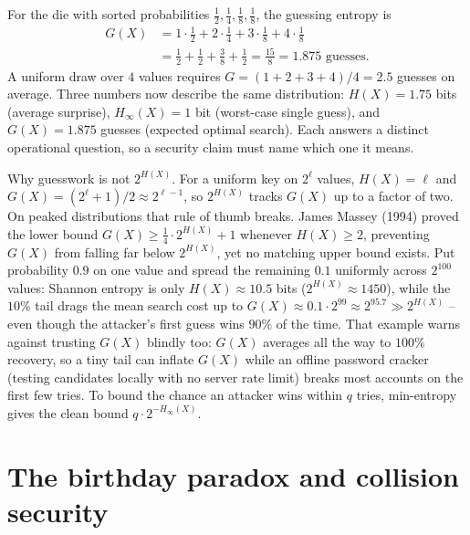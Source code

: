 \begin{example}
\label{ch07:guesswork}
For the die with sorted probabilities $\frac{1}{2}, \frac{1}{4}, \frac{1}{8}, \frac{1}{8}$, the guessing entropy is
\begin{align*}
  G(X) &= 1\cdot\frac{1}{2} + 2\cdot\frac{1}{4} + 3\cdot\frac{1}{8} + 4\cdot\frac{1}{8} \\
       &= \frac{1}{2} + \frac{1}{2} + \frac{3}{8} + \frac{1}{2} = \frac{15}{8} = 1.875\text{ guesses}.
\end{align*}
A uniform draw over $4$ values requires $G = (1+2+3+4)/4 = 2.5$ guesses on average. Three numbers now describe the same distribution: $H(X) = 1.75$ bits (average surprise), $H_\infty(X) = 1$ bit (worst-case single guess), and $G(X) = 1.875$ guesses (expected optimal search). Each answers a distinct operational question, so a security claim must name which one it means.
\end{example}

\begin{whybox}
Why guesswork is not $2^{H(X)}$. For a uniform key on $2^\ell$ values, $H(X) = \ell$ and $G(X) = (2^\ell + 1)/2 \approx 2^{\ell-1}$, so $2^{H(X)}$ tracks $G(X)$ up to a factor of two. On peaked distributions that rule of thumb breaks. James Massey (1994) proved the lower bound $G(X) \ge \frac{1}{4}\cdot 2^{H(X)} + 1$ whenever $H(X) \ge 2$, preventing $G(X)$ from falling far below $2^{H(X)}$, yet no matching upper bound exists. Put probability $0.9$ on one value and spread the remaining $0.1$ uniformly across $2^{100}$ values: Shannon entropy is only $H(X) \approx 10.5$ bits ($2^{H(X)} \approx 1450$), while the $10\%$ tail drags the mean search cost up to $G(X) \approx 0.1 \cdot 2^{99} \approx 2^{95.7} \gg 2^{H(X)}$ -- even though the attacker's first guess wins $90\%$ of the time. That example warns against trusting $G(X)$ blindly too: $G(X)$ averages all the way to $100\%$ recovery, so a tiny tail can inflate $G(X)$ while an offline password cracker (testing candidates locally with no server rate limit) breaks most accounts on the first few tries. To bound the chance an attacker wins within $q$ tries, min-entropy gives the clean bound $q \cdot 2^{-H_\infty(X)}$.
\end{whybox}

\section{The birthday paradox and collision security}

